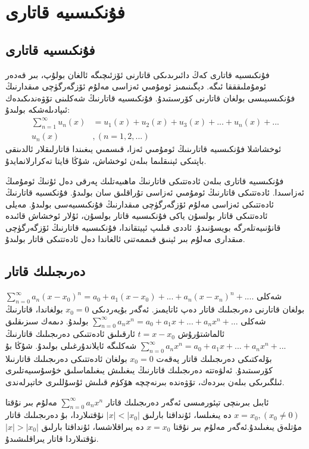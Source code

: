 \section{فۇنكىسىيە قاتارى}

\subsection{فۇنكىسىيە قاتارى}

فۇنكىسىيە قاتارى كەڭ دائىرىدىكى قاتارنى ئۆزئىچىگە ئالغان بولۇپ، بىر قەدەر ئومۇملىقققا ئىگە.
دېگىنىمىز ئومۇمىي ئەزاسى مەلۇم ئۆزگەرگۈچى مىقدارنىڭ فۇنكىسىيىسى بولغان قاتارنى كۆرسىتىدۇ. فۇنكىسىيە قاتارنىڭ شەكلىنى تۆۋەندىكىدەك ئىپادىلەشكە بولىدۇ:
\begin{align*}
	\sum\limits_{n=1}^\infty u_n(x) &= u_1(x)+u_2(x)+u_3(x)+...+u_n(x)+...\\
	u_n(x) &, (n =1,2,...)
\end{align*}
ئوخشاشلا فۇنكىسىيە قاتارىنىڭ ئومۇمىي ئەزا، قىسمىي يىغىندا قاتارلىقلار ئالدىنقى باپتىكى ئېنىقلىما بىلەن ئوخشاش، شۇڭا قايتا تەكرارلانمايدۇ.
\begin{colorful}[cyan]
فۇنكىسىيە قاتارى بىلەن ئادەتتىكى قاتارنىڭ ماھىيەتلىك پەرقى دەل ئۇنىڭ ئومۇمىڭ ئەزاسىدا. ئادەتتىكى قاتارنىڭ ئومۇمىي ئەزاسى تۇراقلىق سان بولىدۇ. فۇنكسىيە قاتارنىڭ ئادەتتىكى ئەزاسى مەلۇم ئۆزگەرگۈچى مىقدارنىڭ فۇنكىسىيەسى بولىدۇ. مەيلى ئادەتتىكى قاتار بولسۇن ياكى فۇنكىسىيە قاتار بولسۇن، ئۇلار ئوخشاش قائىدە قانۇنىيەتلەرگە بويسۇنىدۇ. ئاددى قىلىپ ئېيتقاندا، فۇنكىسىيە قاتارنىڭ ئۆزگەرگۈچى مىقدارى مەلۇم بىر ئېنىق قىممەتنى ئالغاندا دەل ئادەتتىكى قاتار بولىدۇ.
\end{colorful}

\subsection{دەرىجىلىك قاتار}
شەكلى
$
\sum\limits_{n=0}^\infty a_n(x-x_0)^n = a_0 + a_1(x-x_0)+...+a_n(x-x_n)^n+....
$
بولغان قاتارنى دەرىجىلىك قاتار دەپ ئاتايمىز. ئەگەر بۇيەردىكى 
$x_0 = 0$
بولغاندا، قاتارنىڭ شەكلى
$
\sum\limits_{n=0}^\infty a_n x^n = a_0+a_1x+...+a_nx^n+...
$
بولىدۇ. دىمەك سىزىقلىق ئالماشتۇرۇش
$t = x-x_0$
ئارقىلىق ئادەتتىكى دەرىجىلىك قاتارنىڭ 
$
\sum\limits_{n=0}^\infty a_n x^n = a_0+a_1x+...+a_nx^n+...
$
شەكلىگە ئايلاندۇرغىلى بولىدۇ. شۇڭا بۇ بۆلەكتىكى دەرىجىلىك قاتار پەقەت 
$x_0 = 0$
بولغان ئادەتتىكى دەرىجىلىك قاتارنىلا كۆرسىتىدۇ. ئەلۋەتتە دەرىجىلىك قاتارنىڭ يىغىلىش يىغىلماسلىق خۇسۇسىيەتلىرى ئىلگىرىكى بىلەن بىردەك، تۆۋەندە بىرنەچچە ھۆكۈم قىلىش ئۇسۇللىرى خاتېرلەندى.
\begin{MyTheorem}{ئابىل بىرىنچى تېئورمىسى}{}%
	ئەگەر دەرىجىلىك قاتار
	$\sum\limits_{n=0}^\infty a_n x^n$
	مەلۇم بىر نۇقتا
	$x=x_0,(x_0 \neq 0)$
	دە يىغىلسا، ئۇنداقتا بارلىق
	$|x| < |x_0|$
	نۇقتىلاردا، بۇ دەرىجىلىك قاتار مۇتلەق يىغىلىدۇ.ئەگەر مەلۇم بىر نۇقتا
	$x=x_0$
	دە يىراقلاشسا، ئۇنداقتا بارلىق
	$|x| > |x_0|$
	نۇقتىلاردا قاتار يىراقلىشىدۇ.
\end{MyTheorem}

